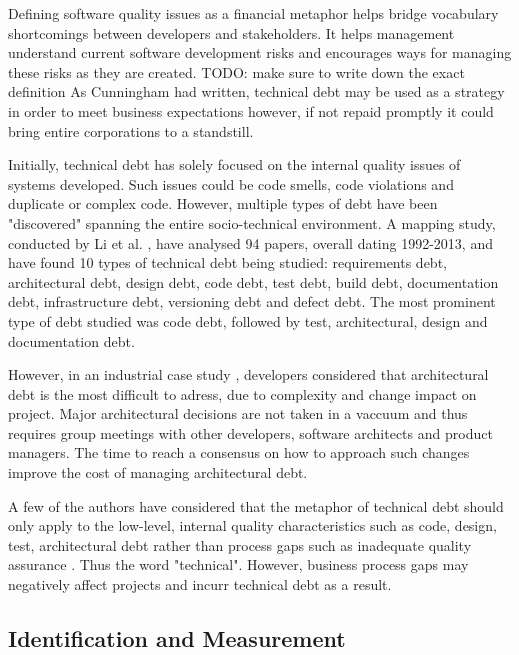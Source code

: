 \documentclass{mprop}
\begin{document}
Defining software quality issues as a financial metaphor helps bridge vocabulary
shortcomings between developers and stakeholders. It helps management understand
current software development risks and encourages ways for managing these risks
as they are created. TODO: make sure to write down the exact definition As
Cunningham \cite{Cunningham1993} had written, technical debt may be used as a
strategy in order to meet business expectations however, if not repaid promptly
it could bring entire corporations to a standstill.

Initially, technical debt has solely focused on the internal quality issues of
systems developed. Such issues could be code smells, code violations and
duplicate or complex code. However, multiple types of debt have been
"discovered" spanning the entire socio-technical environment.
A mapping study, conducted by Li et al. \cite{Li2015}, have analysed 94 papers,
overall dating 1992-2013, and have found 10 types of technical debt being
studied: requirements debt, architectural debt, design debt, code debt, test
debt, build debt, documentation debt, infrastructure debt, versioning debt and
defect debt. The most prominent type of debt studied was code debt, followed by test,
architectural, design and documentation debt.

However, in an industrial case study \cite{Codabux2013}, developers considered that
architectural debt is the most difficult to adress, due to complexity and change
impact on project. Major architectural decisions are not taken in a vaccuum and
thus requires group meetings with other developers, software architects and
product managers. The time to reach a consensus on how to approach such changes
improve the cost of managing architectural debt.

A few of the authors have considered that the metaphor of technical debt should
only apply to the low-level, internal quality characteristics such as code,
design, test, architectural debt rather than process gaps such as inadequate
quality assurance \cite{Theodoropoulos2011} \cite{Nugroho2011}. Thus the word
"technical". However, business process gaps may negatively affect projects and
incurr technical debt as a result.

\subsection{Identification and Measurement}
\end{document}
